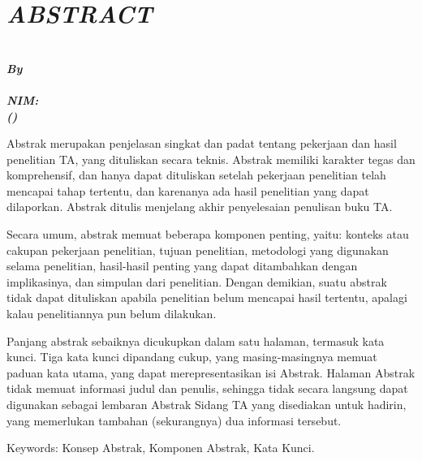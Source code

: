 \chapter{\itshape ABSTRACT}
\label{chp:abstract}
\vspace{\baselineskip}
\begin{center}
  \bfseries\large\itshape
  \MakeUppercase{\titlename} \\
  \vspace{1\baselineskip}
  \normalsize\normalfont\itshape By \\
  \normalfont\bfseries\large \authorname \\
  NIM: \authorid \\
  (\itshape\department) \\
\end{center}
\itshape
\vspace{2\baselineskip}

Abstrak merupakan penjelasan singkat dan padat tentang pekerjaan dan hasil penelitian TA, yang dituliskan secara teknis. Abstrak memiliki karakter tegas dan komprehensif, dan hanya dapat dituliskan setelah pekerjaan penelitian telah mencapai tahap tertentu, dan karenanya ada hasil penelitian yang dapat dilaporkan. Abstrak ditulis menjelang akhir penyelesaian penulisan buku TA.
\vspace{\baselineskip}

\indent Secara umum, abstrak memuat beberapa komponen penting, yaitu: konteks atau cakupan pekerjaan penelitian, tujuan penelitian, metodologi yang digunakan selama penelitian, hasil-hasil penting yang dapat ditambahkan dengan implikasinya, dan simpulan dari penelitian. Dengan demikian, suatu abstrak tidak dapat dituliskan apabila penelitian belum mencapai hasil tertentu, apalagi kalau penelitiannya pun belum dilakukan.
\vspace{\baselineskip}

Panjang abstrak sebaiknya dicukupkan dalam satu halaman, termasuk kata kunci. Tiga kata kunci dipandang cukup, yang masing-masingnya memuat paduan kata utama, yang dapat merepresentasikan isi Abstrak. Halaman Abstrak tidak memuat informasi judul dan penulis, sehingga tidak secara langsung dapat digunakan sebagai lembaran Abstrak Sidang TA yang disediakan untuk hadirin, yang memerlukan tambahan (sekurangnya) dua informasi tersebut.

\begin{flushleft}
  Keywords: Konsep Abstrak, Komponen Abstrak, Kata Kunci.
\end{flushleft}\normalfont